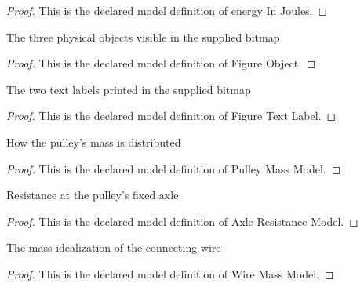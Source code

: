 \begin{proof}
  This is the declared model definition of energy In Joules.
\end{proof}
\begin{definition}
  \label{def:physics:phyx-mini-0770:phyxminiproblems-problemphyxmini0770-figureobject}
  The three physical objects visible in the supplied bitmap
\end{definition}
\begin{proof}
  This is the declared model definition of Figure Object.
\end{proof}
\begin{definition}
  \label{def:physics:phyx-mini-0770:phyxminiproblems-problemphyxmini0770-figuretextlabel}
  The two text labels printed in the supplied bitmap
\end{definition}
\begin{proof}
  This is the declared model definition of Figure Text Label.
\end{proof}
\begin{definition}
  \label{def:physics:phyx-mini-0770:phyxminiproblems-problemphyxmini0770-pulleymassmodel}
  How the pulley's mass is distributed
\end{definition}
\begin{proof}
  This is the declared model definition of Pulley Mass Model.
\end{proof}
\begin{definition}
  \label{def:physics:phyx-mini-0770:phyxminiproblems-problemphyxmini0770-axleresistancemodel}
  Resistance at the pulley's fixed axle
\end{definition}
\begin{proof}
  This is the declared model definition of Axle Resistance Model.
\end{proof}
\begin{definition}
  \label{def:physics:phyx-mini-0770:phyxminiproblems-problemphyxmini0770-wiremassmodel}
  The mass idealization of the connecting wire
\end{definition}
\begin{proof}
  This is the declared model definition of Wire Mass Model.
\end{proof}
